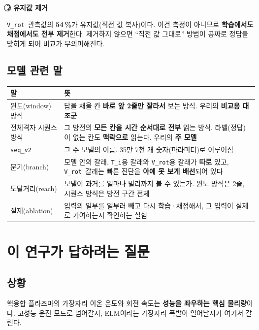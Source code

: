 \documentclass[10pt]{article}
\newcommand{\Ti}{\texttt{T\_i}}
\newcommand{\Vrot}{\texttt{V\_rot}}
\newcommand{\seqv}{\texttt{seq\_v2}}
\begin{document}
\textbf{\textcircled{2} 유지값 제거}

\Vrot\ 관측값의 \textbf{54\,\%}가 유지값(직전 값 복사)이다. 이건 측정이 아니므로
\textbf{학습에서도 채점에서도 전부 제거}한다. 제거하지 않으면 ``직전 값 그대로'' 방법이
공짜로 정답을 맞히게 되어 비교가 무의미해진다.

\subsection{모델 관련 말}

\begin{center}
\begin{tabularx}{\textwidth}{@{}l L@{}}
\toprule
\textbf{말} & \textbf{뜻} \\
\midrule
윈도(window) 방식 & 답을 채울 칸 \textbf{바로 앞 2줄만 잘라서} 보는 방식.
  우리의 \textbf{비교용 대조군} \\
전체격자 시퀀스 방식 & 그 방전의 \textbf{모든 칸을 시간 순서대로 전부} 읽는 방식.
  라벨(정답)이 없는 칸도 \textbf{맥락으로} 읽는다. 우리의 \textbf{주 모델} \\
\seqv & 그 주 모델의 이름. 35만 7천 개 숫자(파라미터)로 이루어짐 \\
분기(branch) & 모델 안의 갈래. \Ti 용 갈래와 \Vrot 용 갈래가 \textbf{따로} 있고,
  \Vrot\ 갈래는 빠른 진단을 \textbf{아예 못 보게 배선}되어 있다 \\
도달거리(reach) & 모델이 과거를 얼마나 멀리까지 볼 수 있는가.
  윈도 방식은 2줄, 시퀀스 방식은 방전 구간 전체 \\
절제(ablation) & 입력의 일부를 일부러 빼고 다시 학습·채점해서, 그 입력이 실제로
  기여하는지 확인하는 실험 \\
\bottomrule
\end{tabularx}
\end{center}

\section{이 연구가 답하려는 질문}

\subsection{상황}

핵융합 플라즈마의 가장자리 이온 온도와 회전 속도는 \textbf{성능을 좌우하는 핵심 물리량}이다.
고성능 운전 모드로 넘어갈지, ELM이라는 가장자리 폭발이 일어날지가 여기서 갈린다.
\end{document}
